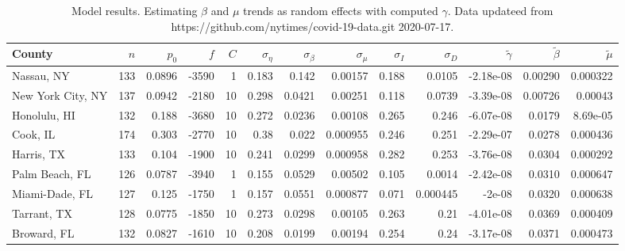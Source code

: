 \documentclass[12pt,letterpaper]{article}
\begin{document}
\begin{sidewaystable}
\caption{\label{tab:sumres}
Model results.
Estimating $\beta$ and $\mu$ trends as random effects with computed $\gamma$.
Data updateed from https://github.com/nytimes/covid-19-data.git
2020-07-17.
}
\centering
{\small

\begin{tabular}{lrrrrrrrrrrrr}
\hline
 County            &   $n$ &   $p_0$ &   $f$ &   $C$ &   $\sigma_\eta$ &   $\sigma_\beta$ &   $\sigma_\mu$ &   $\sigma_I$ &   $\sigma_D$ &   $\tilde\gamma$ &   $\tilde{\beta}$ &   $\tilde{\mu}$ \\
\hline
 Nassau, NY        & 133   &  0.0896 & -3590 &     1 &          0.183  &          0.142   &       0.00157  &       0.188  &     0.0105   &       -2.18e-08  &           0.00290 &        0.000322 \\
 New York City, NY & 137   &  0.0942 & -2180 &    10 &          0.298  &          0.0421  &       0.00251  &       0.118  &     0.0739   &       -3.39e-08  &           0.00726 &        0.00043  \\
 Honolulu, HI      & 132   &  0.188  & -3680 &    10 &          0.272  &          0.0236  &       0.00108  &       0.265  &     0.246    &       -6.07e-08  &           0.0179  &        8.69e-05 \\
 Cook, IL          & 174   &  0.303  & -2770 &    10 &          0.38   &          0.022   &       0.000955 &       0.246  &     0.251    &       -2.29e-07  &           0.0278  &        0.000436 \\
 Harris, TX        & 133   &  0.104  & -1900 &    10 &          0.241  &          0.0299  &       0.000958 &       0.282  &     0.253    &       -3.76e-08  &           0.0304  &        0.000292 \\
 Palm Beach, FL    & 126   &  0.0787 & -3940 &     1 &          0.155  &          0.0529  &       0.00502  &       0.105  &     0.0014   &       -2.42e-08  &           0.0310  &        0.000647 \\
 Miami-Dade, FL    & 127   &  0.125  & -1750 &     1 &          0.157  &          0.0551  &       0.000877 &       0.071  &     0.000445 &       -2e-08     &           0.0320  &        0.000638 \\
 Tarrant, TX       & 128   &  0.0775 & -1850 &    10 &          0.273  &          0.0298  &       0.00105  &       0.263  &     0.21     &       -4.01e-08  &           0.0369  &        0.000409 \\
 Broward, FL       & 132   &  0.0827 & -1610 &    10 &          0.208  &          0.0199  &       0.00194  &       0.254  &     0.24     &       -3.17e-08  &           0.0371  &        0.000473 \\

\end{tabular}}
\end{sidewaystable}
\end{document}
